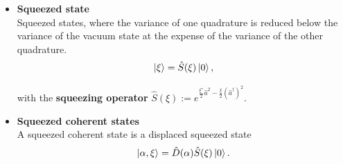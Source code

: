 \documentclass{article}
\begin{document}
\begin{itemize}
	\item \textbf{Squeezed state}\\
	Squeezed states, where the variance of one quadrature is reduced below the variance of the vacuum state at the expense of the variance of the other quadrature.
		\begin{equation}
			\ket{\xi} = \hat{S}(\xi) \ket{0},
		\end{equation}
	
	with the \textbf{squeezing operator} $\hat{S}(\xi) := e^{\frac{\xi^\star}{2} \hat{a}^2 - \frac{\xi}{2} (\hat{a}^\dagger)^2}$.


	\item \textbf{Squeezed coherent states}\\
	A squeezed coherent state is a displaced squeezed state
		\begin{equation}
			\ket{\alpha,\xi} = \hat{D}(\alpha) \hat{S}(\xi) \ket{0}.
		\end{equation}
\end{itemize}


\newpage
\end{document}
